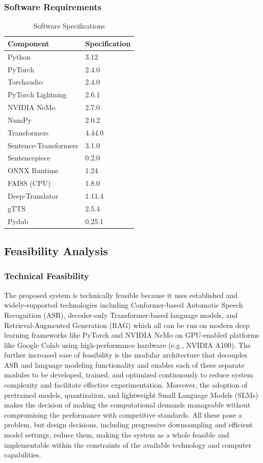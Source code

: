 \subsubsection{Software Requirements}
\begin{table}[H]
\caption{Software Specifications}

\centering
\begin{tabular}{|l|l|}
\hline
\textbf{Component} & \textbf{Specification} \\
\hline
Python & 3.12 \\
PyTorch & 2.4.0 \\
Torchaudio & 2.4.0 \\
PyTorch Lightning & 2.6.1 \\
NVIDIA NeMo & 2.7.0 \\
NumPy & 2.0.2 \\
Transformers & 4.44.0 \\
Sentence-Transformers & 3.1.0 \\
Sentencepiece & 0.2.0 \\
ONNX Runtime & 1.24 \\
FAISS (CPU) & 1.8.0 \\
Deep-Translator & 1.11.4 \\
gTTS & 2.5.4 \\
Pydub & 0.25.1 \\
\hline
\end{tabular}
\end{table}

\subsection{Feasibility Analysis}

\subsubsection{Technical Feasibility}
The proposed system is technically feasible because it uses established and widely-supported technologies including Conformer-based Automatic Speech Recognition (ASR), decoder-only Transformer-based language models, and Retrieval-Augmented Generation (RAG) which all can be run on modern deep learning frameworks like PyTorch and NVIDIA NeMo on GPU-enabled platforms like Google Colab using high-performance hardware (e.g., NVIDIA A100). The further increased ease of feasibility is the modular architecture that decouples ASR and language modeling functionality and enables each of these separate modules to be developed, trained, and optimized continuously to reduce system complexity and facilitate effective experimentation. Moreover, the adoption of pretrained models, quantization, and lightweight Small Language Models (SLMs) makes the decision of making the computational demands manageable without compromising the performance with competitive standards. All these pose a problem, but design decisions, including progressive downsampling and efficient model settings, reduce them, making the system as a whole feasible and implementable within the constraints of the available technology and computer capabilities.

